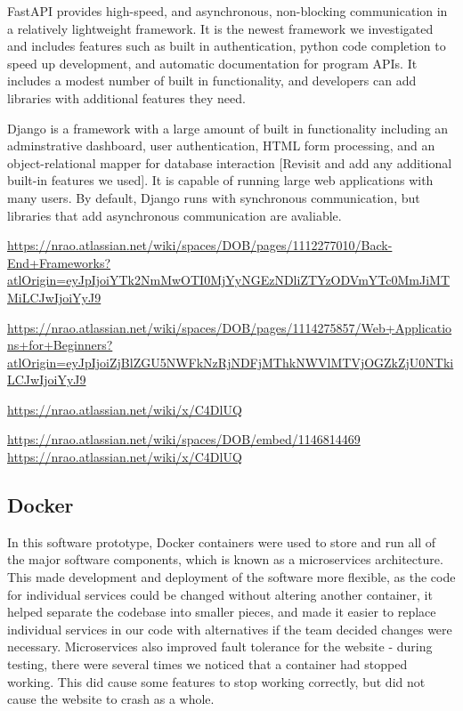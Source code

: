 \documentclass[12pt]{article}
\begin{document}
  FastAPI provides high-speed, and asynchronous, non-blocking communication in a relatively lightweight framework. It is the newest framework we investigated and includes features such as built in authentication, python code completion to speed up development, and automatic documentation for program APIs. It includes a modest number of built in functionality, and developers can add libraries with additional features they need.

  Django is a framework with a large amount of built in functionality including an adminstrative dashboard, user authentication, HTML form processing, and an object-relational mapper for database interaction [Revisit and add any additional built-in features we used]. It is capable of running large web applications with many users. By default, Django runs with synchronous communication, but libraries that add asynchronous communication are avaliable.


\url{https://nrao.atlassian.net/wiki/spaces/DOB/pages/1112277010/Back-End+Frameworks?atlOrigin=eyJpIjoiYTk2NmMwOTI0MjYyNGEzNDliZTYzODVmYTc0MmJiMTMiLCJwIjoiYyJ9}

\url{https://nrao.atlassian.net/wiki/spaces/DOB/pages/1114275857/Web+Applications+for+Beginners?atlOrigin=eyJpIjoiZjBlZGU5NWFkNzRjNDFjMThkNWVlMTVjOGZkZjU0NTkiLCJwIjoiYyJ9}

\url{https://nrao.atlassian.net/wiki/x/C4DlUQ}

\url{https://nrao.atlassian.net/wiki/spaces/DOB/embed/1146814469}
\url{https://nrao.atlassian.net/wiki/x/C4DlUQ}

\subsection*{Docker}

  In this software prototype, Docker containers were used to store and run all of the major software components, which is known as a microservices architecture. This made development and deployment of the software more flexible, as the code for individual services could be changed without altering another container, it helped separate the codebase into smaller pieces, and made it easier to replace individual services in our code with alternatives if the team decided changes were necessary. Microservices also improved fault tolerance for the website - during testing, there were several times we noticed that a container had stopped working. This did cause some features to stop working correctly, but did not cause the website to crash as a whole.
\end{document}
